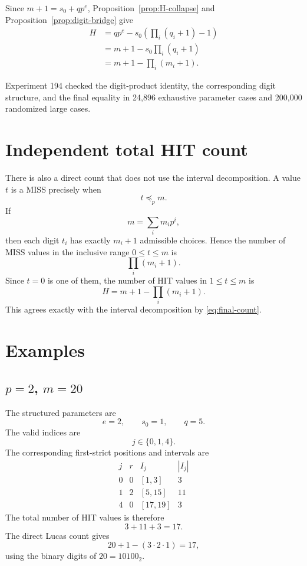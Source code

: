 \documentclass[11pt,a4paper]{article}
\theoremstyle{definition}
\theoremstyle{remark}
\begin{document}
Since $m+1=s_0+qp^e$, Proposition~\ref{prop:H-collapse} and Proposition~\ref{prop:digit-bridge} give
\begin{align}
H
&=qp^e-s_0\left(\prod_i(q_i+1)-1\right)\\
&=m+1-s_0\prod_i(q_i+1)\\
&=\boxed{m+1-\prod_i(m_i+1)}.
\label{eq:final-count}
\end{align}

Experiment 194 checked the digit-product identity, the corresponding digit structure, and the final equality in 24,896 exhaustive parameter cases and 200,000 randomized large cases.

\section{Independent total HIT count}

There is also a direct count that does not use the interval decomposition.  A value $t$ is a MISS precisely when
\[
t\preceq_p m.
\]
If
\[
m=\sum_i m_i p^i,
\]
then each digit $t_i$ has exactly $m_i+1$ admissible choices.  Hence the number of MISS values in the inclusive range $0\le t\le m$ is
\begin{equation}
\boxed{\prod_i(m_i+1)}.
\label{eq:miss-count}
\end{equation}
Since $t=0$ is one of them, the number of HIT values in $1\le t\le m$ is
\begin{equation}
\boxed{
H=m+1-\prod_i(m_i+1).
}
\label{eq:direct-HIT-count}
\end{equation}
This agrees exactly with the interval decomposition by \eqref{eq:final-count}.

\section{Examples}

\subsection{$p=2$, $m=20$}

The structured parameters are
\[
 e=2,
 \qquad
 s_0=1,
 \qquad
 q=5.
\]
The valid indices are
\[
 j\in\{0,1,4\}.
\]
The corresponding first-strict positions and intervals are
\[
\begin{array}{c|c|c|c}
 j&r&I_j&|I_j|\\
\hline
 0&0&[1,3]&3\\
 1&2&[5,15]&11\\
 4&0&[17,19]&3
\end{array}
\]
The total number of HIT values is therefore
\[
3+11+3=17.
\]
The direct Lucas count gives
\[
20+1-(3\cdot2\cdot1)=17,
\]
using the binary digits of $20=10100_2$.
\end{document}
